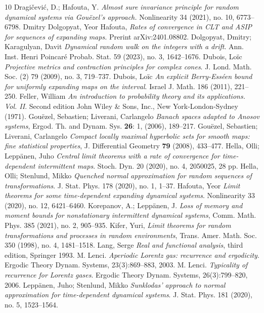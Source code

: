 \documentclass{amsart}
\numberwithin{equation}{section}
\begin{document}
\begin{thebibliography}{10}
  Dragičević, D.; Hafouta, Y. {\em Almost sure invariance principle for random dynamical systems via Gouëzel's approach.} Nonlinearity 34 (2021), no. 10, 6773–6798.
 Dmitry Dolgopyat, Yeor Hafouta, {\em Rates of convergence in CLT and ASIP for sequences of expanding maps.}
Prerint arXiv:2401.08802.
 Dolgopyat, Dmitry; Karagulyan, Davit {\em Dynamical random walk on the integers with a drift}. Ann. Inst. Henri Poincaré Probab. Stat. 59 (2023), no. 3, 1642–1676.
   Dubois, Loïc {\em Projective metrics and contraction principles for complex cones}. J. Lond. Math. Soc. (2) 79 (2009), no. 3, 719–737. 
 Dubois, Loïc {\em An explicit Berry-Esséen bound for uniformly expanding maps on the interval}. Israel J. Math. 186 (2011), 221–250.
 Feller, William {\em An introduction to probability theory and its applications. Vol. II}. Second edition John Wiley \& Sons, Inc., New York-London-Sydney (1971).
 Gou\"ezel, Sebastien; Liverani, Carlangelo {\em Banach spaces adapted to Anosov systems}, Ergod. Th. and Dynam. Sys. {\bf 26}: 1, (2006), 189--217.
 Gou\"ezel, Sebastien; Liverani, Carlangelo {\em Compact locally maximal hyperbolic sets for smooth maps: fine statistical properties}, J. Differential Geometry {\bf 79} (2008), 433--477.
  Hella, Olli; Leppänen, Juho {\em Central limit theorems with a rate of convergence for time-dependent intermittent maps}. 
Stoch. Dyn. 20 (2020), no. 4, 2050025, 28 pp.
 Hella, Olli; Stenlund, Mikko {\em Quenched normal approximation for random sequences of transformations}. J. Stat. Phys. 178 (2020), no. 1, 1–37.
 Hafouta, Yeor {\em Limit theorems for some time-dependent expanding dynamical systems}. Nonlinearity 33 (2020), no. 12, 6421–6460.
 Korepanov, A.; Leppänen, J. {\em Loss of memory and moment bounds for nonstationary intermittent dynamical systems}, Comm. Math. Phys. 385 (2021), no. 2, 905–935. 
 Kifer, Yuri, {\em Limit theorems for random transformations and processes in random environments},
Trans. Amer. Math. Soc. 350 (1998), no. 4, 1481--1518.
 Lang, Serge {\em Real and functional analysis}, third edition, Springer 1993.
 M. Lenci. {\em Aperiodic Lorentz gas: recurrence and ergodicity}. Ergodic Theory Dynam. Systems,
23(3):869–883, 2003.
 M. Lenci. {\em Typicality of recurrence for Lorentz gases}. Ergodic Theory Dynam. Systems,
26(3):799–820, 2006.
  Leppänen, Juho;  Stenlund, Mikko {\em Sunklodas' approach to normal approximation for time-dependent dynamical systems}. J. Stat. Phys. 181 (2020), no. 5, 1523–1564. 

\end{thebibliography}
\end{document}
